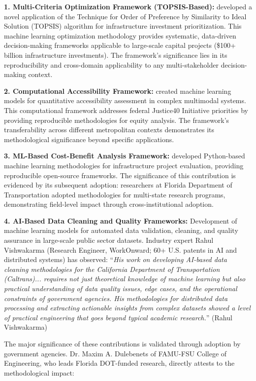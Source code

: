 \textbf{1. Multi-Criteria Optimization Framework (TOPSIS-Based):} \dr developed a novel application of the Technique for Order of Preference by Similarity to Ideal Solution (TOPSIS) algorithm for infrastructure investment prioritization. This machine learning optimization methodology provides systematic, data-driven decision-making frameworks applicable to large-scale capital projects (\$100+ billion infrastructure investments). The framework's significance lies in its reproducibility and cross-domain applicability to any multi-stakeholder decision-making context.

\textbf{2. Computational Accessibility Framework:} \dr created machine learning models for quantitative accessibility assessment in complex multimodal systems. This computational framework addresses federal Justice40 Initiative priorities by providing reproducible methodologies for equity analysis. The framework's transferability across different metropolitan contexts demonstrates its methodological significance beyond specific applications.

\textbf{3. ML-Based Cost-Benefit Analysis Framework:} \dr developed Python-based machine learning methodologies for infrastructure project evaluation, providing reproducible open-source frameworks. The significance of this contribution is evidenced by its subsequent adoption: researchers at Florida Department of Transportation adopted \drs methodologies for multi-state research programs, demonstrating field-level impact through cross-institutional adoption.

\textbf{4. AI-Based Data Cleaning and Quality Frameworks:} Development of machine learning models for automated data validation, cleaning, and quality assurance in large-scale public sector datasets. Industry expert Rahul Vishwakarma (Research Engineer, WorkOnward; 60+ U.S. patents in AI and distributed systems) has observed: ``\textit{His work on developing AI-based data cleaning methodologies for the California Department of Transportation (Caltrans)... requires not just theoretical knowledge of machine learning but also practical understanding of data quality issues, edge cases, and the operational constraints of government agencies. His methodologies for distributed data processing and extracting actionable insights from complex datasets showed a level of practical engineering that goes beyond typical academic research.}'' (Rahul Vishwakarma) \cite{RV1}

The major significance of these contributions is validated through adoption by government agencies. Dr. Maxim A. Dulebenets of FAMU-FSU College of Engineering, who leads Florida DOT-funded research, directly attests to the methodological impact:

